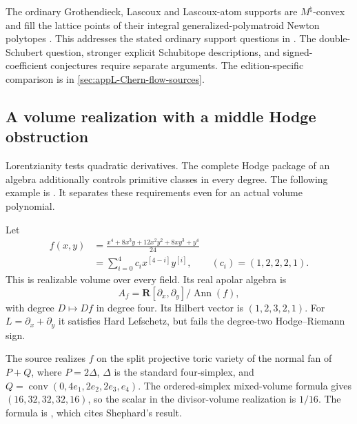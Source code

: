 The ordinary Grothendieck, Lascoux and Lascoux-atom supports are
$M^\natural$-convex and fill the lattice points of their integral
generalized-polymatroid Newton polytopes
\cite[Corollaries~5.12--5.14]{NguyenDangWang26ChernFlowV4}.
This addresses the stated ordinary support questions in
\cite{MonicalTokcanYong17NewtonV2,MeszarosSetiabrataStDizier22SupportV1}.
The double-Schubert question, stronger explicit Schubitope descriptions,
and signed-coefficient conjectures require separate arguments.
The edition-specific comparison is in
\cref{sec:appL-Chern-flow-sources}.

\subsection{A volume realization with a middle Hodge obstruction}
\label{sec:appD-Chern-apolar-obstruction}

Lorentzianity tests quadratic derivatives. The complete Hodge package
of an algebra additionally controls primitive classes in every degree.
The following example is \cite[Example~6.17]{NguyenDangWang26ChernFlowV4}.
It separates these requirements even for an actual volume polynomial.
\begin{example}
\label{ex:appD-volume-apolar-HR}
Let
\[
\begin{aligned}
 f(x,y)&=\frac{x^4+8x^3y+12x^2y^2+8xy^3+y^4}{24}\\
       &=\sum_{i=0}^4 c_i x^{[4-i]}y^{[i]},
       \qquad(c_i)=(1,2,2,2,1).
\end{aligned}
\tag{D.46}\label{eq:appD-Chern-quartic}
\]
This is realizable volume over every field. Its real apolar algebra is
\[
 A_f=\mathbf R[\partial_x,\partial_y]/\operatorname{Ann}(f),
\]
with degree $D\mapsto Df$ in degree four. Its Hilbert vector is
$(1,2,3,2,1)$. For $L=\partial_x+\partial_y$ it satisfies
Hard Lefschetz, but fails the degree-two Hodge--Riemann sign.
\end{example}

The source realizes $f$ on the split projective toric variety of
the normal fan of $P+Q$, where $P=2\Delta$, $\Delta$ is the
standard four-simplex, and
$Q=\operatorname{conv}(0,4e_1,2e_2,2e_3,e_4)$.
The ordered-simplex mixed-volume formula gives
$(16,32,32,32,16)$, so the scalar in the divisor-volume
realization is $1/16$. The formula is
\cite[Lemma~36]{Huh12MilnorV3}, which cites Shephard's result.


